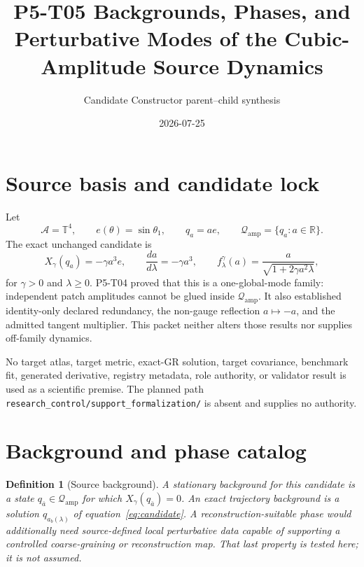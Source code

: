\documentclass[11pt]{article}
\title{P5-T05 Backgrounds, Phases, and Perturbative Modes of the
Cubic-Amplitude Source Dynamics}
\author{Candidate Constructor parent--child synthesis}
\date{2026-07-25}
\newcommand{\Qamp}{\mathcal Q_{\mathrm{amp}}}
\newtheorem{definition}{Definition}
\begin{document}
\maketitle

\begin{center}
\end{center}

\section{Source basis and candidate lock}

Let
\[
 \mathcal A=\mathbb T^4,\qquad
 e(\theta)=\sin\theta_1,\qquad
 q_a=a e,\qquad
 \Qamp=\{q_a:a\in\mathbb R\}.
\]
The exact unchanged candidate is
\begin{equation}
 X_\gamma(q_a)=-\gamma a^3e,\qquad
 \frac{da}{d\lambda}=-\gamma a^3,\qquad
 f^\gamma_\lambda(a)
 =\frac{a}{\sqrt{1+2\gamma a^2\lambda}},
 \label{eq:candidate}
\end{equation}
for \(\gamma>0\) and \(\lambda\geq0\).  P5-T04 proved that this is a
one-global-mode family: independent patch amplitudes cannot be glued inside
\(\Qamp\).  It also established identity-only declared redundancy, the
non-gauge reflection \(a\mapsto-a\), and the admitted tangent multiplier.
This packet neither alters those results nor supplies off-family dynamics.

No target atlas, target metric, exact-GR solution, target covariance,
benchmark fit, generated derivative, registry metadata, role authority, or
validator result is used as a scientific premise.  The planned path
\texttt{research\_control/support\_formalization/} is absent and supplies no
authority.

\section{Background and phase catalog}

\begin{definition}[Source background]
A stationary background for this candidate is a state \(q_{\bar a}\in\Qamp\)
for which \(X_\gamma(q_{\bar a})=0\).  An exact trajectory background is a
solution \(q_{a_b(\lambda)}\) of equation~\eqref{eq:candidate}.  A
\emph{reconstruction-suitable phase} would additionally need source-defined
local perturbative data capable of supporting a controlled coarse-graining
or reconstruction map.  That last property is tested here; it is not assumed.
\end{definition}
\end{document}
